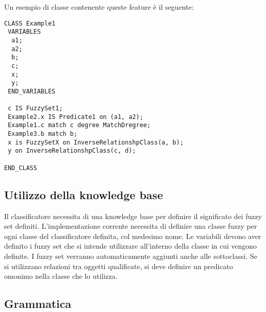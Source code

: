 Un esempio di classe contenente queste feature è il seguente:

\begin{verbatim}
CLASS Example1
 VARIABLES
  a1;
  a2;
  b;
  c;
  x;
  y;
 END_VARIABLES
 
 c IS FuzzySet1;
 Example2.x IS Predicate1 on (a1, a2);
 Example1.c match c degree MatchDregree;
 Example3.b match b;
 x is FuzzySetX on InverseRelationshpClass(a, b);
 y on InverseRelationshpClass(c, d);
 
END_CLASS
\end{verbatim}

\subsection{Utilizzo della knowledge base}
Il classificatore necessita di una knowledge base per definire il significato dei fuzzy set definiti. 
L'implementazione corrente necessita di definire una classe fuzzy per ogni classe del classificatore definita, col medesimo nome.
Le variabili devono aver definito i fuzzy set che si intende utilizzare all'interno della classe in cui vengono definite. I fuzzy set verranno automaticamente aggiunti anche alle sottoclassi.
Se si utilizzano relazioni tra oggetti qualificate, si deve definire un predicato omonimo nella classe che lo utilizza.

\subsection{Grammatica}

